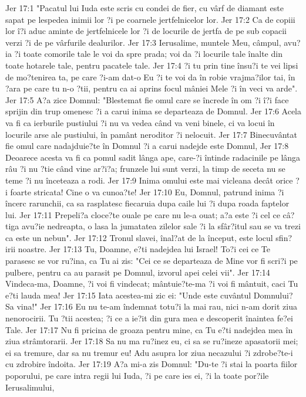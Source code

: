 Jer 17:1  "Pacatul lui Iuda este scris cu condei de fier, cu vârf de diamant este sapat pe lespedea inimii lor ?i pe coarnele jertfelnicelor lor.
Jer 17:2  Ca de copiii lor î?i aduc aminte de jertfelnicele lor ?i de locurile de jertfa de pe sub copacii verzi ?i de pe vârfurile dealurilor.
Jer 17:3  Ierusalime, muntele Meu, câmpul, avu?ia ?i toate comorile tale le voi da spre prada; voi da ?i locurile tale înalte din toate hotarele tale, pentru pacatele tale.
Jer 17:4  ?i tu prin tine însu?i te vei lipsi de mo?tenirea ta, pe care ?i-am dat-o Eu ?i te voi da în robie vrajma?ilor tai, în ?ara pe care tu n-o ?tii, pentru ca ai aprins focul mâniei Mele ?i în veci va arde".
Jer 17:5  A?a zice Domnul: "Blestemat fie omul care se încrede în om ?i î?i face sprijin din trup omenesc ?i a carui inima se departeaza de Domnul.
Jer 17:6  Acela va fi ca ierburile pustiului ?i nu va vedea când va veni binele, ci va locui în locurile arse ale pustiului, în pamânt neroditor ?i nelocuit.
Jer 17:7  Binecuvântat fie omul care nadajduie?te în Domnul ?i a carui nadejde este Domnul,
Jer 17:8  Deoarece acesta va fi ca pomul sadit lânga ape, care-?i întinde radacinile pe lânga râu ?i nu ?tie când vine ar?i?a; frunzele lui sunt verzi, la timp de seceta nu se teme ?i nu înceteaza a rodi.
Jer 17:9  Inima omului este mai vicleana decât orice ?i foarte stricata! Cine o va cunoa?te!
Jer 17:10  Eu, Domnul, patrund inima ?i încerc rarunchii, ca sa rasplatesc fiecaruia dupa caile lui ?i dupa roada faptelor lui.
Jer 17:11  Prepeli?a cloce?te ouale pe care nu le-a ouat; a?a este ?i cel ce câ?tiga avu?ie nedreapta, o lasa la jumatatea zilelor sale ?i la sfâr?itul sau se va trezi ca este un nebun".
Jer 17:12  Tronul slavei, înal?at de la început, este locul sfin?irii noastre.
Jer 17:13  Tu, Doamne, e?ti nadejdea lui Israel! To?i cei ce Te parasesc se vor ru?ina, ca Tu ai zis: "Cei ce se departeaza de Mine vor fi scri?i pe pulbere, pentru ca au parasit pe Domnul, izvorul apei celei vii".
Jer 17:14  Vindeca-ma, Doamne, ?i voi fi vindecat; mântuie?te-ma ?i voi fi mântuit, caci Tu e?ti lauda mea!
Jer 17:15  Iata acestea-mi zic ei: "Unde este cuvântul Domnului? Sa vina!"
Jer 17:16  Eu nu te-am îndemnat totu?i la mai rau, nici n-am dorit ziua nenorocirii. Tu ?tii acestea; ?i ce a ie?it din gura mea e descoperit înaintea fe?ei Tale.
Jer 17:17  Nu fi pricina de groaza pentru mine, ca Tu e?ti nadejdea mea în ziua strâmtorarii.
Jer 17:18  Sa nu ma ru?inez eu, ci sa se ru?ineze apasatorii mei; ei sa tremure, dar sa nu tremur eu! Adu asupra lor ziua necazului ?i zdrobe?te-i cu zdrobire îndoita.
Jer 17:19  A?a mi-a zis Domnul: "Du-te ?i stai la poarta fiilor poporului, pe care intra regii lui Iuda, ?i pe care ies ei, ?i la toate por?ile Ierusalimului,
